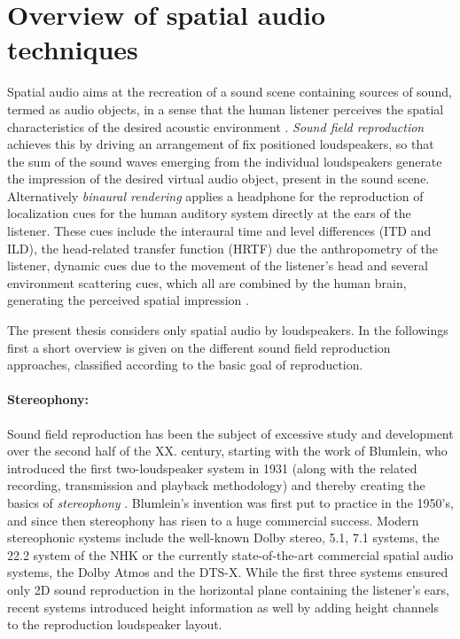 \section{Overview of spatial audio techniques}
Spatial audio aims at the recreation of a sound scene containing sources of sound, termed as audio objects, in a sense that the human listener perceives the spatial characteristics of the desired acoustic environment \cite{Zhang2017}.
\emph{Sound field reproduction} achieves this by driving an arrangement of fix positioned loudspeakers, so that the sum of the sound waves emerging from the individual loudspeakers generate the impression of the desired virtual audio object, present in the sound scene.
Alternatively \emph{binaural rendering} applies a headphone for the reproduction of localization cues for the human auditory system directly at the ears of the listener.
These cues include the interaural time and level differences (ITD and ILD), the head-related transfer function (HRTF) due the anthropometry of the listener, dynamic cues due to the movement of the listener's head and several environment scattering cues, which all are combined by the human brain, generating the perceived spatial impression \cite{Blauert1983}.

The present thesis considers only spatial audio by loudspeakers.
In the followings first a short overview is given on the different sound field reproduction approaches, classified according to the basic goal of reproduction.

\paragraph{Stereophony:}
Sound field reproduction has been the subject of excessive study and development over the second half of the XX. century, starting with the work of Blumlein, who introduced the first two-loudspeaker system in 1931 (along with the related recording, transmission and playback methodology) and thereby creating the basics of \emph{stereophony} \cite{Blumlein1932, Alexander2000}.
Blumlein's invention was first put to practice in the 1950's, and since then stereophony has risen to a huge commercial success.
Modern stereophonic systems include the well-known Dolby stereo, 5.1, 7.1 systems, the 22.2 system of the NHK \cite{hamasaki2005the, hamasaki2011the} or the currently state-of-the-art commercial spatial audio systems, the Dolby Atmos \cite{Atmos} and the DTS-X.
While the first three systems ensured only 2D sound reproduction in the horizontal plane containing the listener's ears, recent systems introduced height information as well by adding height channels to the reproduction loudspeaker layout.


